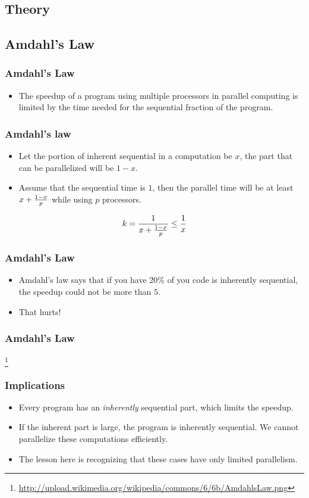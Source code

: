 \documentclass{beamer}
\begin{document}
\begin{CJK}{UTF8}{bsmi}
\section{Theory}

\subsection{Amdahl's Law}

\begin{frame}
\frametitle{Amdahl's Law} 
\begin{itemize}
\item The speedup of a program using multiple processors in parallel computing is limited by the time needed for the sequential fraction of the program.
\end{itemize}
\end{frame}

\begin{frame}
\frametitle{Amdahl's law} 
\begin{itemize}
\item Let the portion of inherent sequential in a computation be $x$, the part that can be parallelized will be $1 - x$.
\item Assume that the sequential time is $1$, then the parallel time will be at least $x + {{1-x} \over p}$ while using $p$ processors.
\end{itemize}

\begin{equation}
k = {1 \over {x + {{1-x} \over p}}} \leq {1 \over x}
\end{equation}
\end{frame}

\begin{frame}
\frametitle{Amdahl's Law} 
\begin{itemize}
\item Amdahl's law says that if you have 20\% of you code is inherently sequential, the speedup could not be more than $5$.
\item That hurts!
\end{itemize}
\end{frame}

\begin{frame}
\frametitle{Amdahl's Law} 
\centerline{}
\footnote{\url{http://upload.wikimedia.org/wikipedia/commons/6/6b/AmdahlsLaw.png}}
\end{frame}

\begin{frame}
\frametitle{Implications}
\begin{itemize}
\item Every program has an {\em inherently} sequential part, which limits the speedup.
\item If the inherent part is large, the program is inherently sequential. 
We cannot parallelize these computations efficiently.
\item The lesson here is recognizing that these cases have only limited parallelism.
\end{itemize}
\end{frame}


\end{CJK}
\end{document}
